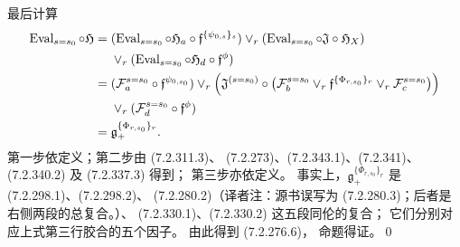 最后计算
\[
\begin{aligned}
\operatorname{Eval}_{s=s_0}\circ\mathfrak H
={}&(\operatorname{Eval}_{s=s_0}\circ\mathfrak H_a
\circ\mathfrak f^{\{\psi_{0,s}\}_s})
\vee_r(\operatorname{Eval}_{s=s_0}\circ\mathfrak J
\circ\mathfrak H_X)\\
&\vee_r(\operatorname{Eval}_{s=s_0}\circ\mathfrak H_d
\circ\mathfrak f^\phi)\\
={}&(\mathcal F_a^{s=s_0}\circ
\mathfrak f^{\psi_{0,s_0}})
\vee_r\Bigl(\mathfrak J^{(s=s_0)}\circ
\bigl(\mathcal F_b^{s=s_0}
\vee_r\mathfrak f^{\{\Phi_{r,s_0}\}_r}
\vee_r\mathcal F_c^{s=s_0}\bigr)\Bigr)\\
&\vee_r(\mathcal F_d^{s=s_0}\circ\mathfrak f^\phi)\\
={}&\mathfrak g_+^{\{\Phi_{r,s_0}\}_r}.
\end{aligned}
\]
第一步依定义；第二步由 (7.2.311.3)、
(7.2.273)、(7.2.343.1)、(7.2.341)、
(7.2.340.2) 及 (7.2.337.3) 得到；
第三步亦依定义。
事实上，$\mathfrak g_+^{\{\Phi_{r,s_0}\}_r}$
是 (7.2.298.1)、(7.2.298.2)、
(7.2.280.2)\textup{（译者注：源书误写为
(7.2.280.3)；后者是右侧两段的总复合。）}、
(7.2.330.1)、(7.2.330.2) 这五段同伦的复合；
它们分别对应上式第三行胶合的五个因子。
由此得到 (7.2.276.6)，
命题得证。\qed
